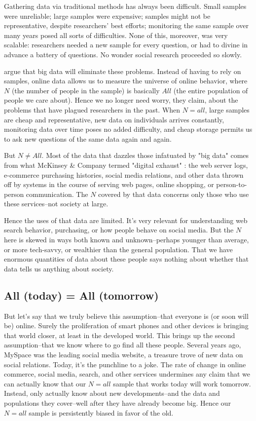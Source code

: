 \documentclass[12pt]{article}
\begin{document}
Gathering data via traditional methods has always been
difficult. Small samples were unreliable; large samples were
expensive; samples might not be representative, despite researchers'
best efforts; monitoring the same sample over many years posed all
sorts of difficulties. None of this, moreover, was very scalable:
researchers needed a new sample for every question, or had to divine
in advance a battery of questions. No wonder social
research proceeded so slowly.

\cite{mayer2013big} argue that big data will eliminate these
problems. Instead of having to rely on samples, online data allows us
to measure the universe of online behavior, where $N$ (the number of
people in the sample) is basically $All$ (the entire population of
people we care about). Hence we no longer need worry, they claim,
about the problems that have plagued researchers in the past. When
$N=all$, large samples are cheap and representative, new data on
individuals arrives constantly,  monitoring data over time poses no
added difficulty, and cheap storage permits us to ask new questions of
the same data again and again.

But $N\neq All$. Most of the data that dazzles those infatuated by
"big data" comes from what McKinsey \& Company termed "digital
exhaust" \citep{mckinsey2011}: the web server logs, e-commerce
purchasing histories, social media relations, and other data thrown
off by systems in the course of serving web pages, online shopping,
or person-to-person communication. The $N$ covered by that data
concerns only those who use these services--not society at large.

Hence the uses of that data are limited. It's very relevant for
understanding web search behavior, purchasing, or how people behave on
social media. But the $N$ here is skewed in ways both known and
unknown--perhaps younger than average, or more tech-savvy, or
wealthier than the general population. That we have enormous
quantities of data about these people says nothing about whether that
data tells us anything about society.



\subsection{All (today) = All (tomorrow)}
\label{sec:all-today-tomorrow}

But let's say that we truly believe this assumption--that everyone is
(or soon will be) online. Surely the proliferation of smart phones and
other devices is bringing that world closer, at least in the developed
world. This brings up the second assumption--that we know where to go
find all these people. Several years ago, MySpace was the leading
social media website, a treasure trove of new data on social
relations. Today, it's the punchline to a joke. The rate of change in
online commerce, social media, search, and other services undermines
any claim that we can actually know that our $N=all$ sample that works
today will work tomorrow. Instead, only actually know about new
developments--and the data and populations they cover--well after they
have already become big. Hence our $N=all$ sample is persistently
biased in favor of the old.
\end{document}
